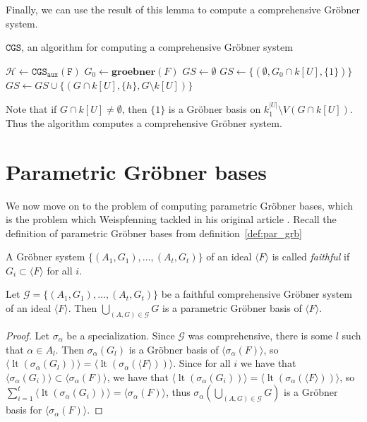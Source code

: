 \documentclass[a4paper, 12pt]{article}
\DeclareMathOperator{\LT}{lt}
\theoremstyle{changedot}
\theoremstyle{changedotbreak}
\theoremstyle{nonumberplain}
\newtheorem{proof}{Proof}
\begin{document}
Finally, we can use the result of this lemma to compute a comprehensive Gröbner system.

\begin{algorithm}
  \caption{$\mathtt{CGS}$, an algorithm for computing a comprehensive Gröbner system}
  $\mathcal H \gets \mathtt{CGS_{aux}(F)}$\;
  $G_{0} \gets \mathbf{groebner}(F)$\;
  $GS \gets \emptyset$\;
   {
    $GS \gets \{(\emptyset, G_{0} \cap k[U], \{1\})\}$\;
  }
   {
    $GS \gets GS \cup \{(G \cap k[U], \{h\}, G \setminus k[U])\}$\;
  }
  \;
\end{algorithm}
Note that if $G \cap k[U] \neq \emptyset$, then $\{1\}$ is a Gröbner basis on $k_{1}^{|U|} \setminus V(G \cap k[U])$. Thus the algorithm computes a comprehensive Gröbner system.

\section{Parametric Gröbner bases}
We now move on to the problem of computing parametric Gröbner bases, which is the problem which Weispfenning tackled in his original article \cite{Weispfenning}. Recall the definition of parametric Gröbner bases from definition~\ref{def:par_grb}

\begin{definition}
  A Gröbner system $\{(A_{1}, G_{1}), \dots, (A_{t}, G_{t})\}$ of an ideal $\langle F \rangle$ is called \textit{faithful} if $G_{i} \subset \langle F \rangle$ for all $i$.
\end{definition}

\begin{corollary}\label{cor:faithful_cgs_to_cgb}
  Let $\mathcal G = \{(A_{1}, G_{1}), \dots, (A_{t}, G_{t})\}$ be a faithful comprehensive Gröbner system of an ideal $\langle F \rangle$. Then $\bigcup_{(A, G) \in \mathcal G} G$ is a parametric Gröbner basis of $\langle F \rangle$.
\end{corollary}
\begin{proof}
  Let $\sigma_{\alpha}$ be a specialization. Since $\mathcal G$ was comprehensive, there is some $l$ such that $\alpha \in A_{l}$. Then $\sigma_{\alpha}(G_{l})$ is a Gröbner basis of $\langle \sigma_{\alpha}(F) \rangle$, so $\langle \LT(\sigma_{\alpha}(G_{l})) \rangle = \langle \LT(\sigma_{\alpha}(\langle F \rangle)) \rangle$. Since for all $i$ we have that $\langle \sigma_{\alpha}(G_{i}) \rangle \subset \langle \sigma_{\alpha}(F) \rangle$, we have that $\langle \LT(\sigma_{\alpha}(G_{i})) \rangle = \langle \LT(\sigma_{\alpha}(\langle F \rangle)) \rangle$, so $\sum_{i=1}^{t} \langle \LT(\sigma_{\alpha}(G_{i})) \rangle = \langle \sigma_{\alpha}(F) \rangle$, thus $\sigma_{\alpha}\left(\bigcup_{(A, G) \in \mathcal G} G\right)$ is a Gröbner basis for $\langle \sigma_{\alpha}(F) \rangle$.
\end{proof}
\end{document}
